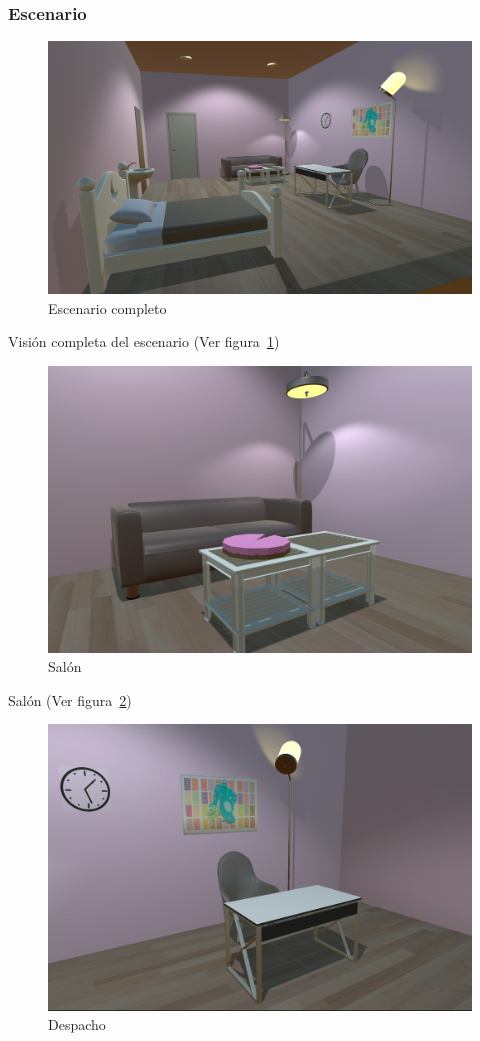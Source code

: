 \documentclass[12pt, a4paper,twoside,titlepage]{book}
\begin{document}
\subsubsection{Escenario}


\begin{figure}
	\centering
	\includegraphics[width=.8\linewidth]{TGF/Artes/Escenario.png}
	\caption{Escenario completo}
	\label{fig:ArtesEsce}
\end{figure}


Visión completa del escenario (Ver figura~\ref{fig:ArtesEsce})

\begin{figure}
	\centering
	\includegraphics[width=.8\linewidth]{TGF/Artes/Saloncito.png}
	\caption{Salón}
	\label{fig:ArtesSalon}
\end{figure}

Salón (Ver figura~\ref{fig:ArtesSalon})

\begin{figure}
	\centering
	\includegraphics[width=.8\linewidth]{TGF/Artes/Despachito.png}
	\caption{Despacho}
	\label{fig:ArtesDesp}
\end{figure}
\end{document}
